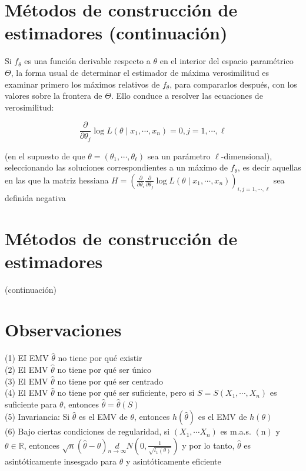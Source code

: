 \section*{Métodos de construcción de estimadores (continuación)}
Si $f_{\theta}$ es una función derivable respecto a $\theta$ en el interior del espacio paramétrico $\Theta$, la forma usual de determinar el estimador de máxima verosimilitud es examinar primero los máximos relativos de $f_{\theta}$, para compararlos después, con los valores sobre la frontera de $\Theta$. Ello conduce a resolver las ecuaciones de verosimilitud:

$$
  \frac{\partial}{\partial \theta_{j}} \log L\left(\theta \mid x_{1}, \cdots, x_{n}\right)=0, j=1, \cdots, \ell
$$

(en el supuesto de que $\theta=\left(\theta_{1}, \cdots, \theta_{\ell}\right)$ sea un parámetro $\ell$-dimensional), seleccionando las soluciones correspondientes a un máximo de $f_{\theta}$, es decir aquellas en las que la matriz hessiana $H=\left(\frac{\partial}{\partial \theta_{i}} \frac{\partial}{\partial \theta_{j}} \log L\left(\theta \mid x_{1}, \cdots, x_{n}\right)\right)_{i, j=1, \cdots, \ell}$ sea definida negativa

\section*{Métodos de construcción de estimadores}
 (continuación)

\section*{Observaciones}
 (1) EI EMV $\hat{\theta}$ no tiene por qué existir\\
(2) El EMV $\hat{\theta}$ no tiene por qué ser único\\
(3) El EMV $\hat{\theta}$ no tiene por qué ser centrado\\
(4) El EMV $\hat{\theta}$ no tiene por qué ser suficiente, pero si $S=S\left(X_{1}, \cdots, X_{n}\right)$ es suficiente para $\theta$, entonces $\hat{\theta}=\hat{\theta}(S)$\\
(5) Invariancia: Si $\hat{\theta}$ es el EMV de $\theta$, entonces $h(\hat{\theta})$ es el EMV de $h(\theta)$\\
(6) Bajo ciertas condiciones de regularidad, si $\left(X_{1}, \cdots X_{n}\right)$ es m.a.s. $(\mathrm{n})$ y $\theta \in \mathbb{R}$, entonces $\sqrt{n}(\hat{\theta}-\theta) \underset{n \rightarrow \infty}{d} N\left(0, \frac{1}{\sqrt{l_{1}(\theta)}}\right)$ y por lo tanto, $\hat{\theta}$ es asintóticamente insesgado para $\theta$ y asintóticamente eficiente
